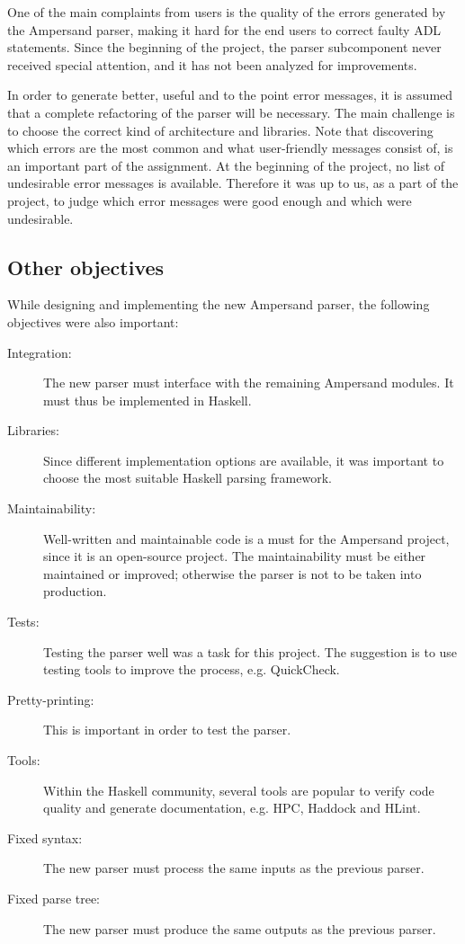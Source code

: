 One of the main complaints from users is the quality of the errors generated by the Ampersand parser, making it hard for the end users to correct faulty ADL statements.
Since the beginning of the project, the parser subcomponent never received special attention, and it has not been analyzed for improvements.

In order to generate better, useful and to the point error messages, it is assumed that a complete refactoring of the parser will be necessary.
The main challenge is to choose the correct kind of architecture and libraries.
Note that discovering which errors are the most common and what user-friendly messages consist of, is an important part of the assignment.
At the beginning of the project, no list of undesirable error messages is available.
Therefore it was up to us, as a part of the project, to judge which error messages were good enough and which were undesirable.

\subsection{Other objectives}
While designing and implementing the new Ampersand parser, the following objectives were also important:
\begin{description}
  \item [Integration:] The new parser must interface with the remaining Ampersand modules.
    It must thus be implemented in Haskell.
  \item [Libraries:] Since different implementation options are available, it was important to choose the most suitable Haskell parsing framework.
  \item [Maintainability:] Well-written and maintainable code is a must for the Ampersand project, since it is an open-source project.
    The maintainability must be either maintained or improved; otherwise the parser is not to be taken into production.
  \item [Tests:] Testing the parser well was a task for this project.
    The suggestion is to use testing tools to improve the process, e.g. QuickCheck.
  \item [Pretty-printing:] This is important in order to test the parser.
%
%
%
  \item [Tools:] Within the Haskell community, several tools are popular to verify code quality and generate documentation, e.g. HPC, Haddock and HLint.
  \item [Fixed syntax:] The new parser must process the same inputs as the previous parser.
  \item [Fixed parse tree:] The new parser must produce the same outputs as the previous parser.
\end{description}


